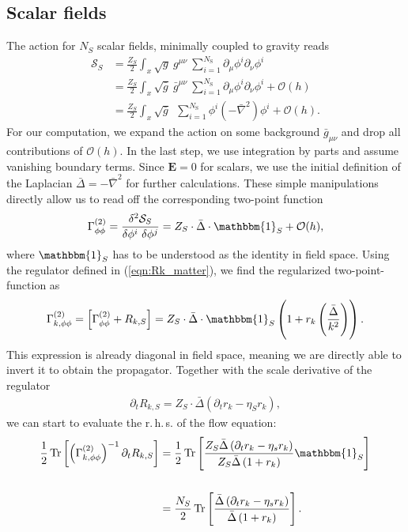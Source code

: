 \subsection{Scalar fields}
The action for $N_S$ scalar fields, minimally coupled to gravity reads
\begin{align}
	\mathcal{S}_S &= \frac{Z_{S}}{2}\int_x \sqrt{g} \ g^{\mu\nu} \ \sum\limits_{i=1}^{N_{\text{S}}} \partial_{\mu}\phi^{i}\partial_{\nu}\phi^{i} \nonumber \\
&=  \frac{Z_{S}}{2}\int_x \sqrt{\bar{g}} \ \bar{g}^{\mu\nu} \ \sum\limits_{i=1}^{N_{\text{S}}} \partial_{\mu}\phi^{i}\partial_{\nu}\phi^{i} + \mathcal{O}(h) \\
&= \frac{Z_{S}}{2}\int_x \sqrt{\bar{g}} \ \ \sum\limits_{i=1}^{N_{\text{S}}} \phi^{i}\left(-\bar{\nabla}^2\right)\phi^{i} + \mathcal{O}(h). \nonumber
\end{align}
For our computation, we expand the action on some background $\bar{g}_{\mu\nu}$ and drop all contributions of $\mathcal{O}(h)$. In the last step, we use integration by parts and assume vanishing boundary terms. Since $\mathbf{E} =0$ for scalars, we use the initial definition of the Laplacian $\bar{\Delta} = -\bar{\nabla}^2$ for further calculations. These simple manipulations directly allow us to read off the corresponding two-point function
\begin{align}
	\Gamma^{(2)}_{\phi\phi} = \frac{\delta^2 \mathcal{S}_S}{\delta\phi^{i}\ \delta\phi^{j}} = Z_S \cdot\bar{\Delta}\cdot\mathbbm{1}_S + \mathcal{O}(h),
\end{align}
where $\mathbbm{1}_S$ has to be understood as the identity in field space. Using the regulator defined in (\ref{eqn:Rk_matter}), we find the regularized two-point-function as
\begin{align}
	\Gamma^{(2)}_{k, \phi\phi} = \left[\Gamma^{(2)}_{\phi\phi}+ R_{k, S}\right]  = Z_S \cdot\bar{\Delta}\cdot\mathbbm{1}_S\left(1 + r_k\left(\frac{\bar{\Delta}}{k^2}\right)\right).
\end{align}
This expression is already diagonal in field space, meaning we are directly able to invert it to obtain the propagator. Together with the scale derivative of the regulator
\begin{align}
	\partial_t R_{k, S} = Z_S\cdot\bar{\Delta}\left(\partial_t r_k - \eta_S r_k\right),
\end{align}
we can start to evaluate the r.\,h.\,s. of the flow equation:
\begin{align}
	\frac{1}{2}\tr{\left(\Gamma^{(2)}_{k, \phi\phi}\right)^{-1}\partial_t R_{k,S}} &= \frac{1}{2}\tr{\frac{Z_S\bar{\Delta}\left(\partial_t r_k - \eta_s r_k\right)}{Z_S \bar{\Delta}\left(1 + r_k\right)}\mathbbm{1}_S} \nonumber\\
	\phantom{.} \\
	&=   \frac{N_S}{2}\tr{\frac{\bar{\Delta}\left(\partial_t r_k - \eta_s r_k\right)}{\bar{\Delta}\left(1 + r_k\right)}}. \nonumber
\end{align}
